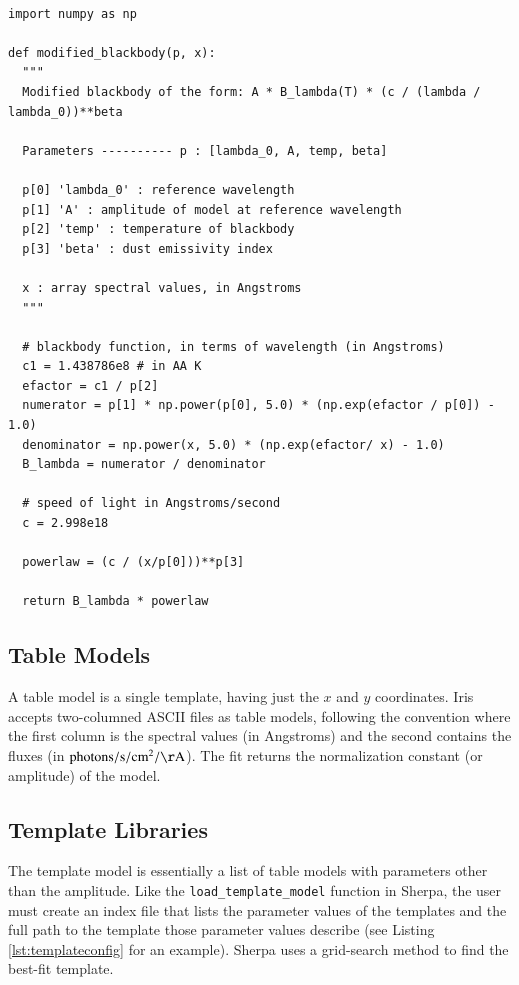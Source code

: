 \documentclass[final,5p,authoryear]{elsarticle}
\begin{document}
\begin{lstlisting}[style=python,
	caption={Example of a user-defined model that
can be dynamically loaded into Iris. The code implements a modified blackbody
and can be combined in Iris with other built-in and custom components.},
	label=lst:user_model_example]

import numpy as np

def modified_blackbody(p, x):
  """
  Modified blackbody of the form: A * B_lambda(T) * (c / (lambda / lambda_0))**beta

  Parameters ---------- p : [lambda_0, A, temp, beta]

  p[0] 'lambda_0' : reference wavelength
  p[1] 'A' : amplitude of model at reference wavelength
  p[2] 'temp' : temperature of blackbody
  p[3] 'beta' : dust emissivity index

  x : array spectral values, in Angstroms
  """

  # blackbody function, in terms of wavelength (in Angstroms)
  c1 = 1.438786e8 # in AA K
  efactor = c1 / p[2]
  numerator = p[1] * np.power(p[0], 5.0) * (np.exp(efactor / p[0]) - 1.0)
  denominator = np.power(x, 5.0) * (np.exp(efactor/ x) - 1.0)
  B_lambda = numerator / denominator

  # speed of light in Angstroms/second
  c = 2.998e18

  powerlaw = (c / (x/p[0]))**p[3]

  return B_lambda * powerlaw
\end{lstlisting}


\subsection{Table Models} A table model is a single template, having just the
$x$ and $y$ coordinates. Iris accepts two-columned ASCII files as table models,
following the convention where the first column is the spectral values (in
Angstroms) and the second contains the fluxes (in
$\mathrm{photons}/\mathrm{s}/\mathrm{cm}^{2}/\mathrm{\AA}$). The fit returns the
normalization constant (or amplitude) of the model.

\subsection{Template Libraries} The template model is essentially a list of
table models with parameters other than the amplitude. Like the
\texttt{load\_template\_model} function in Sherpa, the user must create an index
file that lists the parameter values of the templates and the full path to the
template those parameter values describe (see Listing \ref{lst:templateconfig}
for an example). Sherpa uses a grid-search method to find the best-fit template.
\end{document}
